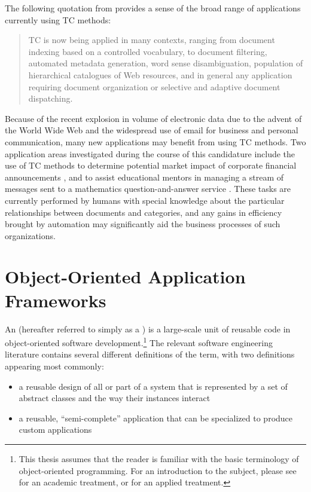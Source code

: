 The following quotation from \cite{sebastiani:02} provides a sense of
the broad range of applications currently using TC methods:

\begin{quote}
TC is now being applied in many contexts, ranging from document
indexing based on a controlled vocabulary, to document filtering,
automated metadata generation, word sense disambiguation, population
of hierarchical catalogues of Web resources, and in general any
application requiring document organization or selective and adaptive
document dispatching.
\end{quote}

Because of the recent explosion in volume of electronic data due to
the advent of the World Wide Web and the widespread use of email for
business and personal communication, many new applications may benefit
from using TC methods.  Two application areas investigated during the
course of this candidature include the use of TC methods to determine
potential market impact of corporate financial announcements
\cite{calvo:02}, and to assist educational mentors in managing a
stream of messages sent to a mathematics question-and-answer service
\cite{williams:02}.  These tasks are currently performed by humans
with special knowledge about the particular relationships between
documents and categories, and any gains in efficiency brought by
automation may significantly aid the business processes of such
organizations.

\section{Object-Oriented Application Frameworks}

An  (hereafter referred to
simply as a ) is a large-scale unit of reusable code
in object-oriented software development.\footnote{This thesis assumes
  that the reader is familiar with the basic terminology of
  object-oriented programming.  For an introduction to the subject,
  please see \cite{wirfs:90} for an academic treatment, or
  \cite{conway:99} for an applied treatment.}  The relevant software
engineering literature contains several different definitions of the
term, with two definitions appearing most commonly:

\begin{itemize}
\item a reusable design of all or part of a system that is represented
  by a set of abstract classes and the way their instances interact
  \cite{johnson:97}
\item a reusable, ``semi-complete'' application that can be
  specialized to produce custom applications \cite{fayad:97}
\end{itemize}

